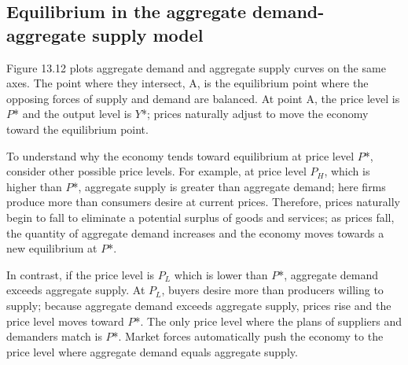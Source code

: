 \documentclass[11pt]{article} %
\begin{document}
\subsection*{Equilibrium in the aggregate demand-aggregate supply model}
Figure 13.12 plots aggregate demand and aggregate supply curves on the same axes. The point where they intersect, A, is the equilibrium point where the opposing forces of supply and demand are balanced. At point A, the price level is \(P\)* and the output level is \(Y\)*; prices naturally adjust to move the economy toward the equilibrium point.

To understand why the economy tends toward equilibrium at price level \(P\)*, consider other possible price levels. For example, at price level \(P_H\), which is higher than \(P\)*, aggregate supply is greater than aggregate demand; here firms produce more than consumers desire at current prices. Therefore, prices naturally begin to fall to eliminate a potential surplus of goods and services; as prices fall, the quantity of aggregate demand increases and the economy moves towards a new equilibrium at \(P\)*.

In contrast, if the price level is \(P_L\) which is lower than \(P\)*, aggregate demand exceeds aggregate supply. At \(P_L\), buyers desire more than producers willing to supply; because aggregate demand exceeds aggregate supply, prices rise and the price level moves toward \(P\)*. The only price level where the plans of suppliers and demanders match is \(P\)*. Market forces automatically push the economy to the price level where aggregate demand equals aggregate supply.
\end{document}
